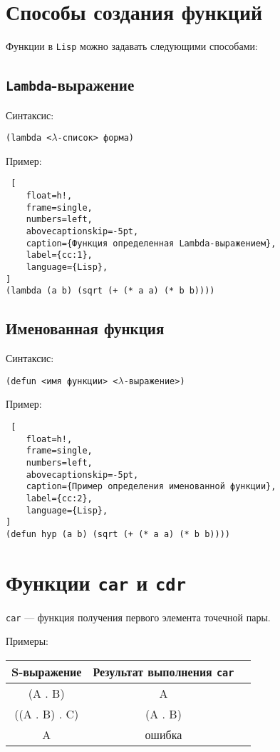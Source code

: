\section{Способы создания функций}

Функции в \texttt{Lisp} можно задавать следующими способами:
 
\subsection*{\texttt{Lambda}-выражение}

Синтаксис:

\texttt{(lambda <$\lambda$-список> форма)}

Пример:

\begin{lstlisting} [
	float=h!,
	frame=single,
	numbers=left,
	abovecaptionskip=-5pt,
	caption={Функция определенная Lambda-выражением},
	label={cc:1},
	language={Lisp},
]
(lambda (a b) (sqrt (+ (* a a) (* b b))))
\end{lstlisting}

\subsection*{Именованная функция}

Синтаксис:

\texttt{(defun <имя функции> <$\lambda$-выражение>)}

Пример:

\begin{lstlisting} [
	float=h!,
	frame=single,
	numbers=left,
	abovecaptionskip=-5pt,
	caption={Пример определения именованной функции},
	label={cc:2},
	language={Lisp},
]
(defun hyp (a b) (sqrt (+ (* a a) (* b b))))
\end{lstlisting}

\section{Функции \texttt{car} и \texttt{cdr}}

\texttt{car} --- функция получения первого элемента точечной пары.

Примеры:

\begin{table}[!ht]
    \small
	\begin{center}
		\begin{tabular}{|c|c|c|}
            \hline
            \bfseries S-выражение & \bfseries Результат выполнения \texttt{car} \\\hline
            (A . B) & A \\\hline
            ((A . B) . C) & (A . B) \\\hline
            A & ошибка \\\hline
		\end{tabular}
	\end{center}
\end{table}

